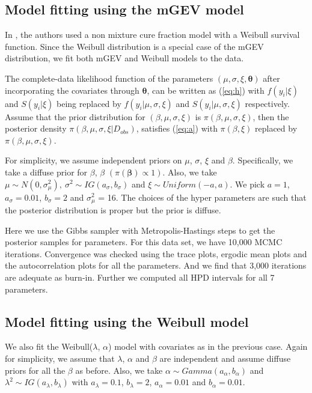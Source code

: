 \documentclass[smallextended]{svjour3}       %
\begin{document}
{\subsection{Model fitting using the mGEV model}
In \citet{smoll:2012}, the authors used a non mixture cure fraction model with a Weibull survival function. Since the Weibull distribution is a special case of the mGEV distribution, we fit both mGEV and Weibull models to the data. 

The complete-data likelihood function of the parameters $(\mu,\sigma,\xi,\mathbf{\theta})$
after incorporating the covariates through $\mathbf{\theta}$, can be written as (\ref{eq:h}) with $f(y_i|\xi)$ and $S(y_i|\xi)$ being replaced by $f(y_i|\mu, \sigma, \xi)$ and $S(y_i|\mu, \sigma, \xi)$ respectively. Assume that the prior distribution for $(\beta,\mu,\sigma,\xi)$ is $\pi(\beta,\mu,\sigma,\xi)$,
then the posterior density $\pi(\beta, \mu, \sigma, \xi| D_{obs})$, satisfies (\ref{eq:a}) with $\pi(\beta, \xi)$ replaced by $\pi(\beta, \mu, \sigma, \xi)$.

For simplicity, we assume independent priors on $\mu$, $\sigma$, $\xi$ and $\beta$. Specifically, we take a diffuse prior for $\beta$, $\beta$ $(\pi(\mathbf{\beta})\varpropto1)$. Also, we take $\mu\sim N(0,\sigma_{\mu}^{2}),\ \sigma^{2}\sim IG(a_{\sigma},b_{\sigma})$ and $\xi\sim Uniform(-a,a)$. We pick $a=1$, $a_{\sigma}=0.01$, $b_{\sigma}=2$ and $\sigma_{\mu}^{2}$ = 16. The choices of the hyper parameters are such that the posterior distribution is proper but the prior is diffuse. 

Here we use the Gibbs sampler with Metropolis-Hastings steps to get the posterior samples for parameters. For this data set, we have 10,000 MCMC iterations. Convergence was checked using the trace plots, ergodic mean plots and the autocorrelation plots for all the parameters. And we find that 3,000 iterations are adequate as burn-in. Further we computed all HPD intervals for all 7 parameters.

\subsection{Model fitting using the Weibull model}

We also fit the Weibull($\lambda$, $\alpha$) model with covariates as in the previous case. Again for simplicity, we assume that $\lambda$, $\alpha$ and $\beta$ are independent and assume diffuse priors for all the $\beta$ as before. Also,
we take $\alpha\sim Gamma(a_\alpha,b_\alpha)$ and $\lambda^{2}\sim IG(a_\lambda,b_\lambda)$ with $a_\lambda=0.1$, $b_\lambda=2$, $a_\alpha=0.01$ and $b_\alpha=0.01$. 


}
\end{document}
